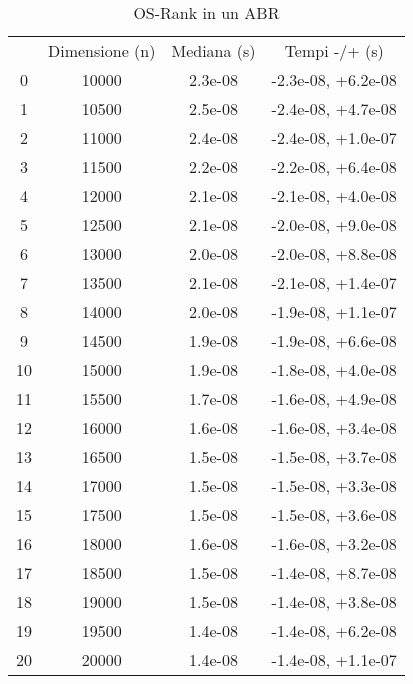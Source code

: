 \begin{table}
\centering
\caption{OS-Rank in un ABR}
\label{OS-Rank in un ABR}
\begin{adjustbox}{width=1\textwidth/2}
\begin{tabular}{|c|c|c|c|}
\hline
 & Dimensione (n) & Mediana (s) & Tempi -/+ (s) \\
0 & 10000 & 2.3e-08 & -2.3e-08, +6.2e-08 \\
\cline{1-4}
1 & 10500 & 2.5e-08 & -2.4e-08, +4.7e-08 \\
\cline{1-4}
2 & 11000 & 2.4e-08 & -2.4e-08, +1.0e-07 \\
\cline{1-4}
3 & 11500 & 2.2e-08 & -2.2e-08, +6.4e-08 \\
\cline{1-4}
4 & 12000 & 2.1e-08 & -2.1e-08, +4.0e-08 \\
\cline{1-4}
5 & 12500 & 2.1e-08 & -2.0e-08, +9.0e-08 \\
\cline{1-4}
6 & 13000 & 2.0e-08 & -2.0e-08, +8.8e-08 \\
\cline{1-4}
7 & 13500 & 2.1e-08 & -2.1e-08, +1.4e-07 \\
\cline{1-4}
8 & 14000 & 2.0e-08 & -1.9e-08, +1.1e-07 \\
\cline{1-4}
9 & 14500 & 1.9e-08 & -1.9e-08, +6.6e-08 \\
\cline{1-4}
10 & 15000 & 1.9e-08 & -1.8e-08, +4.0e-08 \\
\cline{1-4}
11 & 15500 & 1.7e-08 & -1.6e-08, +4.9e-08 \\
\cline{1-4}
12 & 16000 & 1.6e-08 & -1.6e-08, +3.4e-08 \\
\cline{1-4}
13 & 16500 & 1.5e-08 & -1.5e-08, +3.7e-08 \\
\cline{1-4}
14 & 17000 & 1.5e-08 & -1.5e-08, +3.3e-08 \\
\cline{1-4}
15 & 17500 & 1.5e-08 & -1.5e-08, +3.6e-08 \\
\cline{1-4}
16 & 18000 & 1.6e-08 & -1.6e-08, +3.2e-08 \\
\cline{1-4}
17 & 18500 & 1.5e-08 & -1.4e-08, +8.7e-08 \\
\cline{1-4}
18 & 19000 & 1.5e-08 & -1.4e-08, +3.8e-08 \\
\cline{1-4}
19 & 19500 & 1.4e-08 & -1.4e-08, +6.2e-08 \\
\cline{1-4}
20 & 20000 & 1.4e-08 & -1.4e-08, +1.1e-07 \\
\cline{1-4}
\end{tabular}
\end{adjustbox}
\end{table}
